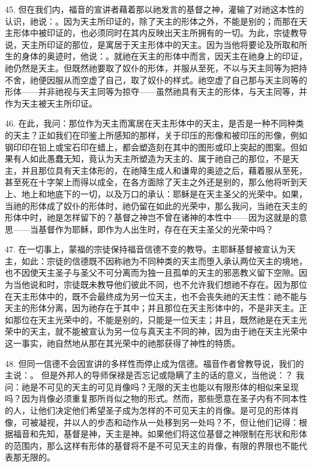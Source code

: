 45. 但在我们内，福音的宣讲者藉着那以祂发言的基督之神，灌输了对祂这本性的认识，祂说：。因为天主所印证的，除了天主的形体之外，不能是别的；而那在天主形体中被印证的，也必须同时在其内反映出天主所拥有的一切。为此，宗徒教导说，天主所印证的那位，是寓居于天主形体中的天主。因为当他将要论及所取和所生的身体的奥迹时，他说：。就祂在天主的形体中而言，因天主在祂身上的印证，祂仍然是天主。但既然祂要取了奴仆的形体，并服从至死，不以与天主同等为把持不舍，祂便因服从而空虚了自己，取了奴仆的样式。祂空虚了自己那与天主同等的形体——并非祂视与天主同等为掠夺——虽然祂具有天主的形体，与天主同等，并作为天主被天主所印证。\par

46. 在此，我问：那位作为天主而寓居在天主形体中的天主，是否是一种不同种类的天主？正如我们在印鉴上所感知的那样，关于印压的形像和被印压的形像，例如钢印印在铅上或宝石印在蜡上，都会塑造刻在其中的图形或印上突起的图案。但如果有人如此愚蠢无知，竟认为天主所塑造为天主的、属于祂自己的那位，不是天主，并且那位具有天主体形的，在祂降生成人和谦卑的奥迹之后，藉着服从至死，甚至死在十字架上而得以成全，在各方面除了天主之外还是别的，那么他将听到天上、地上和地底下的一切，以及万口的承认：耶稣是在天主圣父的光荣中。如果，当祂的形体成了奴仆的形体时，祂仍留在如此的光荣中，那么我问，当祂在天主的形体中时，祂是怎样留下的？基督之神岂不曾在诸神的本性中——因为这就是的意思——当基督作为耶稣，即作为人出生时，存在在天主圣父的光荣中吗？\par

47. 在一切事上，蒙福的宗徒保持福音信德不变的教导。主耶稣基督被宣认为天主，如此：宗徒的信德既不因称祂为不同种类的天主而堕入承认两位天主的境地，也不因使天主圣子与圣父不可分离而为独一且孤单的天主的邪恶教义留下空隙。因为当他说和时，宗徒既未教导他们彼此不同，也不允许我们想祂不存在。因为那位在天主形体中的，既不会最终成为另一位天主，也不会丧失祂的天主性：祂不能与天主的形体分离，因为祂存在于其中；并且那位在天主形体中的，不是非天主。正如那位在天主光荣中的，不能是别的，只能是一位天主；并且，既然祂是在天主光荣中的天主，就不能被宣认为另一位与真天主不同的神，因为由于祂在天主光荣中这一事实，祂自然地从那在其光荣中的祂那获得了神性的特质。\par

48. 但同一信德不会因宣讲的多样性而停止成为信德。福音作者曾教导说，我们的主说：。 但是外邦人的导师保禄是否忘记或隐瞒了主的话的意义，当他说：？ 我问：祂是不可见的天主的可见肖像吗？无限的天主也能以有限形体的相似来呈现吗？因为肖像必须重复那所肖似之物的形式。然而，那些愿意在圣子内有不同本性的人，让他们决定他们希望圣子成为怎样的不可见天主的肖像。是可见的形体肖像，可被凝视，并以人的步态和动作从一处移到另一处吗？不，但让他们记得：根据福音和先知，基督是神，天主是神。如果他们将这位基督之神限制在形状和形体的范围内，那么这样有形体的基督将不是不可见天主的肖像，有限的界限也不能代表那无限的。\par

